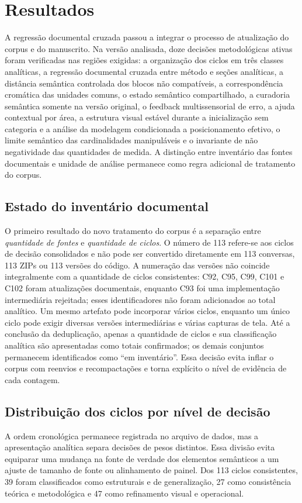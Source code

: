 \documentclass[preprint,12pt,authoryear]{elsarticle}
\begin{document}
\section{Resultados}
A regressão documental cruzada passou a integrar o processo de atualização do corpus e do manuscrito. Na versão analisada, doze decisões metodológicas ativas foram verificadas nas regiões exigidas: a organização dos ciclos em três classes analíticas, a regressão documental cruzada entre método e seções analíticas, a distância semântica controlada dos blocos não compatíveis, a correspondência cromática das unidades comuns, o estado semântico compartilhado, a curadoria semântica somente na versão original, o feedback multissensorial de erro, a ajuda contextual por área, a estrutura visual estável durante a inicialização sem categoria e a análise da modelagem condicionada a posicionamento efetivo, o limite semântico das cardinalidades manipuláveis e o invariante de não negatividade das quantidades de medida. A distinção entre inventário das fontes documentais e unidade de análise permanece como regra adicional de tratamento do corpus.

\subsection{Estado do inventário documental}
O primeiro resultado do novo tratamento do corpus é a separação entre \emph{quantidade de fontes} e \emph{quantidade de ciclos}. O número de 113 refere-se aos ciclos de decisão consolidados e não pode ser convertido diretamente em 113 conversas, 113 ZIPs ou 113 versões do código. A numeração das versões não coincide integralmente com a quantidade de ciclos consistentes: C92, C95, C99, C101 e C102 foram atualizações documentais, enquanto C93 foi uma implementação intermediária rejeitada; esses identificadores não foram adicionados ao total analítico. Um mesmo artefato pode incorporar vários ciclos, enquanto um único ciclo pode exigir diversas versões intermediárias e várias capturas de tela. Até a conclusão da deduplicação, apenas a quantidade de ciclos e sua classificação analítica são apresentadas como totais confirmados; os demais conjuntos permanecem identificados como ``em inventário''. Essa decisão evita inflar o corpus com reenvios e recompactações e torna explícito o nível de evidência de cada contagem.

\subsection{Distribuição dos ciclos por nível de decisão}
A ordem cronológica permanece registrada no arquivo de dados, mas a apresentação analítica separa decisões de pesos distintos. Essa divisão evita equiparar uma mudança na fonte de verdade dos elementos semânticos a um ajuste de tamanho de fonte ou alinhamento de painel. Dos 113 ciclos consistentes, 39 foram classificados como estruturais e de generalização, 27 como consistência teórica e metodológica e 47 como refinamento visual e operacional.
\end{document}

